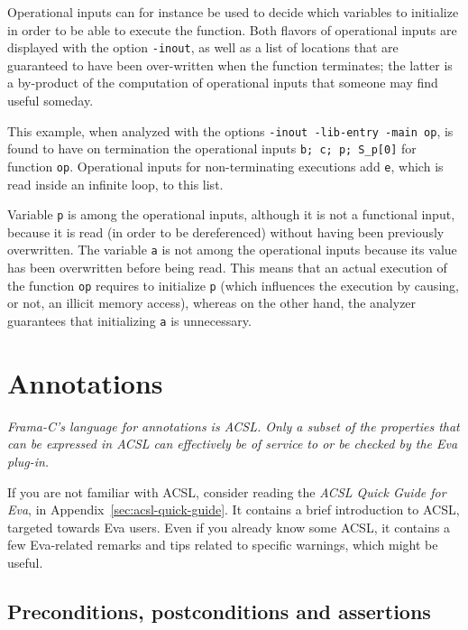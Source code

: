 \documentclass[web]{frama-c-book}
\newcommand{\Eva}{\textsf{Eva}}
\begin{document}
Operational inputs can for instance be used 
to decide which variables to initialize in order to
be able to execute the function.
Both flavors of operational inputs are displayed with
the option \lstinline|-inout|, as well as a list of locations that
are guaranteed to have been over-written when the function terminates; 
the latter is a by-product of the computation of operational
inputs that someone may find useful someday.


This example, when analyzed with the options \lstinline|-inout -lib-entry -main op|,
is found to have on termination the operational 
inputs \lstinline|b; c; p; S_p[0]| for function \lstinline|op|. 
Operational inputs for non-terminating executions add \lstinline|e|, which is
read inside an infinite loop, to this list.

Variable \lstinline|p| is among the operational
inputs, although it is not a functional input, because it is read
(in order to be dereferenced) without having been previously overwritten.
The variable \lstinline|a| is not among the operational inputs because its value
has been overwritten before being read. This means that an actual
execution of the function \lstinline|op| requires to initialize \lstinline|p|
(which influences the execution by causing, or not, 
an illicit memory access), whereas on the other hand, the analyzer
guarantees that initializing \lstinline|a| is unnecessary.

\chapter{Annotations}\label{annotations}
\vspace{2cm}

{\em Frama-C's language for annotations is ACSL. Only a subset
of the properties that can be expressed in ACSL can effectively
be of service to or be checked by the \Eva{} plug-in.}

\vspace{2cm}

If you are not familiar with ACSL, consider reading the
{\em ACSL Quick Guide for Eva}, in Appendix~\ref{sec:acsl-quick-guide}.
It contains a brief introduction to ACSL, targeted towards Eva users.
Even if you already know some ACSL, it contains a few Eva-related remarks
and tips related to specific warnings, which might be useful.

\section{Preconditions, postconditions and assertions}
\label{prepostasserts}
\end{document}
